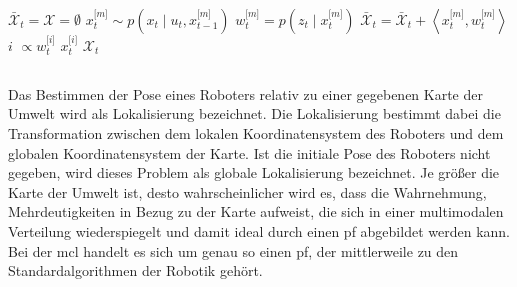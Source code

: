 
\begin{algorithm}
\begin{onehalfspacing}
	\DontPrintSemicolon
	{
		$\bar{\mathcal{X}}_t = \mathcal{X} = \emptyset$\;
		{
			\KwSample $x^{\lbrack m \rbrack}_t \sim p(x_t \mid u_t, x^{\lbrack m \rbrack}_{t-1})$\;
			$w^{\lbrack m \rbrack}_t = p(z_t \mid x^{\lbrack m \rbrack}_t)$\;
			$\bar{\mathcal{X}}_t = \bar{\mathcal{X}}_t + \left \langle x^{\lbrack m \rbrack}_t, w^{\lbrack m \rbrack}_t \right \rangle$\;
		}
		{
			\KwDraw $i$ \KwWithProb $\propto w^{\lbrack i \rbrack}_t$\;
			\KwAdd $x^{\lbrack i \rbrack}_t$ \KwTo $\mathcal{X}_t$\;
		}
	}
\label{alg:algorithm_particle_filter}
\end{onehalfspacing}
\end{algorithm}


%
%
\subsection{}

Das Bestimmen der Pose eines Roboters relativ zu einer gegebenen Karte der Umwelt wird als Lokalisierung bezeichnet. Die Lokalisierung bestimmt dabei die Transformation zwischen dem lokalen Koordinatensystem des Roboters und dem globalen Koordinatensystem der Karte. Ist die initiale Pose des Roboters nicht gegeben, wird dieses Problem als globale Lokalisierung bezeichnet. Je größer die Karte der Umwelt ist, desto wahrscheinlicher wird es, dass die Wahrnehmung, Mehrdeutigkeiten in Bezug zu der Karte aufweist, die sich in einer multimodalen Verteilung wiederspiegelt und damit ideal durch einen \gls{pf} abgebildet werden kann. Bei der \gls{mcl} handelt es sich um genau so einen \gls{pf}, der mittlerweile zu den Standardalgorithmen der Robotik gehört.


